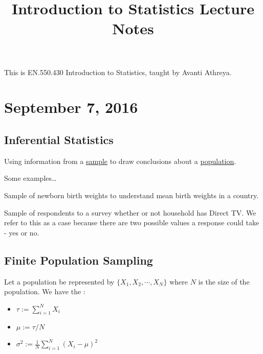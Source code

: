 \documentclass{article}
\begin{document}
\title{Introduction to Statistics Lecture Notes}
\maketitle
	This is EN.550.430 Introduction to Statistics, taught by Avanti Athreya.

\thispagestyle{fancy}

\tableofcontents
\newpage

\section{September 7, 2016}
\subsection{Inferential Statistics}

\begin{definition}
	Using information from a \ul{sample} to draw conclusions about a \ul{population}.
\end{definition}

\begin{example}
	Some examples\ldots
	\begin{enumerate}
		\ii Sample of newborn birth weights to understand mean birth weights in a country.

		\ii Sample of respondents to a survey whether or not household has Direct TV. We refer to this as a  case because there are two possible values a response could take - yes or no.
	\end{enumerate}
\end{example}

\subsection{Finite Population Sampling}

Let a population be represented by $\{X_1, X_2, \cdots, X_N\}$ where $N$ is the size of the population. We have the :

\begin{itemize}
	\item {}$\displaystyle\tau:=\sum_{i=1}^N X_i$
	
	\item {}$\mu:=\tau/N$

	\item {}$\displaystyle\sigma^2:=\frac{1}{N}\sum_{i=1}^N(X_i-\mu)^2$
\end{itemize}
\end{document}
